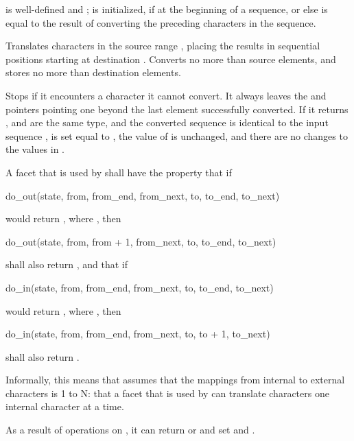\begin{itemdescr}
\pnum
\expects
{} is well-defined and ;
 is initialized, if at the beginning of a sequence,
or else is equal to the result of converting
the preceding characters in the sequence.

\pnum
\effects
Translates characters in the source range ,
placing the results in sequential positions starting at destination .
Converts no more than  source elements, and
stores no more than  destination elements.

\pnum
Stops if it encounters a character it cannot convert.
It always leaves the  and  pointers
pointing one beyond the last element successfully converted.
If it returns ,
 and  are the same type, and
the converted sequence is identical to
the input sequence ,
 is set equal to ,
the value of  is unchanged, and
there are no changes to the values in .

\pnum
A  facet
that is used by 
shall have the property that if
\begin{codeblock}
do_out(state, from, from_end, from_next, to, to_end, to_next)
\end{codeblock}
would return ,
where ,
then
\begin{codeblock}
do_out(state, from, from + 1, from_next, to, to_end, to_next)
\end{codeblock}
shall also return ,
and that if
\begin{codeblock}
do_in(state, from, from_end, from_next, to, to_end, to_next)
\end{codeblock}
would return ,
where ,
then
\begin{codeblock}
do_in(state, from, from_end, from_next, to, to + 1, to_next)
\end{codeblock}
shall also return .
\begin{footnote}
Informally, this means that 
assumes that the mappings from internal to external characters is 1 to N:
that a  facet that is used by 
can translate characters one internal character at a time.
\end{footnote}
\begin{note}
As a result of operations on ,
it can return  or  and
set  and .
\end{note}


\end{itemdescr}
